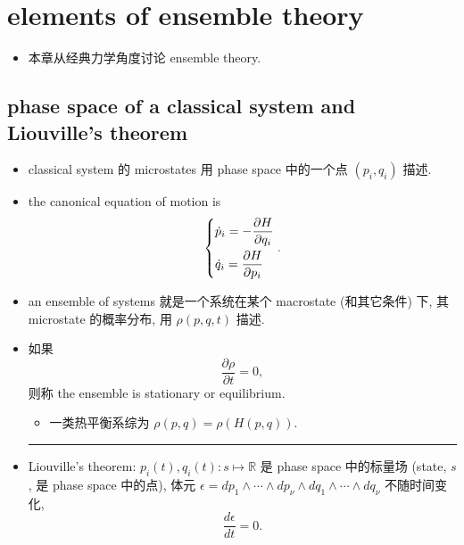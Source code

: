 \chapter{elements of ensemble theory} \label{2}
\begin{itemize}
	\item 本章从经典力学角度讨论 ensemble theory.
\end{itemize}

\section{phase space of a classical system and Liouville's theorem}
\begin{itemize}
	\item classical system 的 microstates 用 phase space 中的一个点 $(p_i, q_i)$ 描述.
	
	\item the canonical equation of motion is
	\begin{equation}
		\begin{dcases}
			\dot{p}_i = - \frac{\partial H}{\partial q_i} \\
			\dot{q}_i = \frac{\partial H}{\partial p_i}
		\end{dcases}.
	\end{equation}
	
	\item an ensemble of systems 就是一个系统在某个 macrostate (和其它条件) 下, 其 microstate 的概率分布, 用 $\rho(p, q, t)$ 描述.
	
	\item 如果
	\begin{equation} \label{2.1.2}
		\frac{\partial \rho}{\partial t} = 0,
	\end{equation}
	则称 the ensemble is stationary or equilibrium.
	\begin{itemize}
		\item 一类热平衡系综为 $\rho(p, q) = \rho(H(p, q))$.
	\end{itemize}
	
	\noindent\rule[0.5ex]{\linewidth}{0.5pt} %
	
	\item Liouville's theorem: $p_i(t), q_i(t) : s \mapsto \mathbb{R}$ 是 phase space 中的标量场 (state, $s$, 是 phase space 中的点), 体元 $\epsilon = dp_1 \wedge \cdots \wedge dp_\nu \wedge dq_1 \wedge \cdots \wedge dq_\nu$ 不随时间变化,
	\begin{equation}
		\frac{d\epsilon}{dt} = 0.
	\end{equation}
	

\end{itemize}

